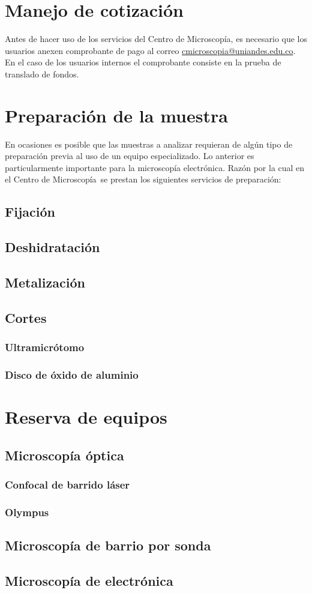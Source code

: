 \documentclass[11pt]{article}
\makeatletter
\newcommand{\centro}{Centro de Microscop\'ia}
\newcommand{\correo}{\url{cmicroscopia@uniandes.edu.co}}
\makeatother
\begin{document}
	\section{Manejo de cotizaci\'on}
	Antes de hacer uso de los servicios del \centro, es necesario que los usuarios anexen comprobante de pago al correo \correo. En el caso de los usuarios internos el comprobante consiste en la prueba de translado de fondos.
	
	\section{Preparaci\'on de la muestra}
	En ocasiones es posible que las muestras a analizar requieran de alg\'un tipo de preparaci\'on previa al uso de un equipo especializado. Lo anterior es particularmente importante para la microscop\'ia electr\'onica. Raz\'on por la cual en el \centro\ se prestan los siguientes servicios de preparaci\'on:
	\subsection{Fijaci\'on}
	\subsection{Deshidrataci\'on}
	\subsection{Metalizaci\'on}
	\subsection{Cortes}
	\subsubsection{Ultramicr\'otomo}
	\subsubsection{Disco de \'oxido de aluminio}
	
	\section{Reserva de equipos}
	\subsection{Microscop\'ia \'optica}
	\subsubsection{Confocal de barrido l\'aser}
	\subsubsection{Olympus}
	\subsection{Microscop\'ia de barrio por sonda}
	\subsection{Microscop\'ia de electr\'onica}
	
\end{document}
